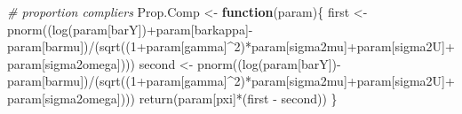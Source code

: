 \documentclass[
]{book}
\newenvironment{Shaded}{\begin{snugshade}}{\end{snugshade}}
\newcommand{\CommentTok}[1]{\textcolor[rgb]{0.56,0.35,0.01}{\textit{#1}}}
\newcommand{\ControlFlowTok}[1]{\textcolor[rgb]{0.13,0.29,0.53}{\textbf{#1}}}
\newcommand{\DecValTok}[1]{\textcolor[rgb]{0.00,0.00,0.81}{#1}}
\newcommand{\FunctionTok}[1]{\textcolor[rgb]{0.00,0.00,0.00}{#1}}
\newcommand{\NormalTok}[1]{#1}
\newcommand{\OtherTok}[1]{\textcolor[rgb]{0.56,0.35,0.01}{#1}}
\newcommand{\SpecialCharTok}[1]{\textcolor[rgb]{0.00,0.00,0.00}{#1}}
\newcommand{\StringTok}[1]{\textcolor[rgb]{0.31,0.60,0.02}{#1}}
\theoremstyle{definition}
\theoremstyle{definition}
\theoremstyle{definition}
\theoremstyle{definition}
\theoremstyle{remark}
\begin{document}
\begin{Shaded}
\begin{Highlighting}[]
\CommentTok{\# proportion compliers}
\NormalTok{Prop.Comp }\OtherTok{\textless{}{-}} \ControlFlowTok{function}\NormalTok{(param)\{}
\NormalTok{  first }\OtherTok{\textless{}{-}} \FunctionTok{pnorm}\NormalTok{((}\FunctionTok{log}\NormalTok{(param[}\StringTok{\textquotesingle{}barY\textquotesingle{}}\NormalTok{])}\SpecialCharTok{+}\NormalTok{param[}\StringTok{\textquotesingle{}barkappa\textquotesingle{}}\NormalTok{]}\SpecialCharTok{{-}}\NormalTok{param[}\StringTok{\textquotesingle{}barmu\textquotesingle{}}\NormalTok{])}\SpecialCharTok{/}\NormalTok{(}\FunctionTok{sqrt}\NormalTok{((}\DecValTok{1}\SpecialCharTok{+}\NormalTok{param[}\StringTok{\textquotesingle{}gamma\textquotesingle{}}\NormalTok{]}\SpecialCharTok{\^{}}\DecValTok{2}\NormalTok{)}\SpecialCharTok{*}\NormalTok{param[}\StringTok{\textquotesingle{}sigma2mu\textquotesingle{}}\NormalTok{]}\SpecialCharTok{+}\NormalTok{param[}\StringTok{\textquotesingle{}sigma2U\textquotesingle{}}\NormalTok{]}\SpecialCharTok{+}\NormalTok{param[}\StringTok{\textquotesingle{}sigma2omega\textquotesingle{}}\NormalTok{])))}
\NormalTok{  second }\OtherTok{\textless{}{-}} \FunctionTok{pnorm}\NormalTok{((}\FunctionTok{log}\NormalTok{(param[}\StringTok{\textquotesingle{}barY\textquotesingle{}}\NormalTok{])}\SpecialCharTok{{-}}\NormalTok{param[}\StringTok{\textquotesingle{}barmu\textquotesingle{}}\NormalTok{])}\SpecialCharTok{/}\NormalTok{(}\FunctionTok{sqrt}\NormalTok{((}\DecValTok{1}\SpecialCharTok{+}\NormalTok{param[}\StringTok{\textquotesingle{}gamma\textquotesingle{}}\NormalTok{]}\SpecialCharTok{\^{}}\DecValTok{2}\NormalTok{)}\SpecialCharTok{*}\NormalTok{param[}\StringTok{\textquotesingle{}sigma2mu\textquotesingle{}}\NormalTok{]}\SpecialCharTok{+}\NormalTok{param[}\StringTok{\textquotesingle{}sigma2U\textquotesingle{}}\NormalTok{]}\SpecialCharTok{+}\NormalTok{param[}\StringTok{\textquotesingle{}sigma2omega\textquotesingle{}}\NormalTok{])))}
  \FunctionTok{return}\NormalTok{(param[}\StringTok{\textquotesingle{}pxi\textquotesingle{}}\NormalTok{]}\SpecialCharTok{*}\NormalTok{(first }\SpecialCharTok{{-}}\NormalTok{ second))  }
\NormalTok{\}}


\end{Highlighting}
\end{Shaded}
\end{document}
